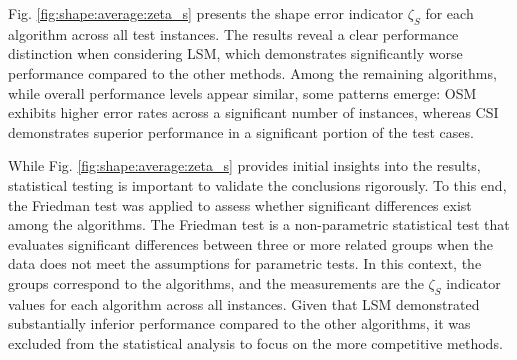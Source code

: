\documentclass{IEEEtran}
\begin{document}
                Fig. \ref{fig:shape:average:zeta_s} presents the shape error indicator $\zeta_S$ for each algorithm across all test instances. The results reveal a clear performance distinction when considering LSM, which demonstrates significantly worse performance compared to the other methods. Among the remaining algorithms, while overall performance levels appear similar, some patterns emerge: OSM exhibits higher error rates across a significant number of instances, whereas CSI demonstrates superior performance in a significant portion of the test cases.


                While Fig. \ref{fig:shape:average:zeta_s} provides initial insights into the results, statistical testing is important to validate the conclusions rigorously. To this end, the Friedman test \cite{friedman1937use} was applied to assess whether significant differences exist among the algorithms. The Friedman test is a non-parametric statistical test that evaluates significant differences between three or more related groups when the data does not meet the assumptions for parametric tests. In this context, the groups correspond to the algorithms, and the measurements are the $\zeta_S$ indicator values for each algorithm across all instances. Given that LSM demonstrated substantially inferior performance compared to the other algorithms, it was excluded from the statistical analysis to focus on the more competitive methods.
                
\end{document}
